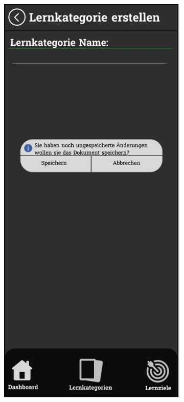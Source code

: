     \newpage

    \begin{figure}[htbp]
        \centering
        \begin{subfigure}[b]{0.45\linewidth}
          \centering
          \includegraphics[width=\linewidth]{images/Mockups/createLernkategorie.JPG}

\end{subfigure}
\end{figure}
